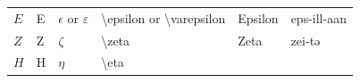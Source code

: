 \documentclass[
]{book}
\begin{document}
\begin{longtable}[]{@{}llllll@{}}
\begin{minipage}[t]{0.18\columnwidth}
\(Ε\)\strut
\end{minipage} & \begin{minipage}[t]{0.17\columnwidth}\raggedright
Ε\strut
\end{minipage} & \begin{minipage}[t]{0.18\columnwidth}\raggedright
\(\epsilon\) or \(\varepsilon\)\strut
\end{minipage} & \begin{minipage}[t]{0.17\columnwidth}\raggedright
\textbackslash epsilon or \textbackslash varepsilon\strut
\end{minipage} & \begin{minipage}[t]{0.06\columnwidth}\raggedright
Epsilon\strut
\end{minipage} & \begin{minipage}[t]{0.08\columnwidth}\raggedright
eps-ill-aan\strut
\end{minipage}\tabularnewline
\begin{minipage}[t]{0.18\columnwidth}\raggedright
\(Ζ\)\strut
\end{minipage} & \begin{minipage}[t]{0.17\columnwidth}\raggedright
Ζ\strut
\end{minipage} & \begin{minipage}[t]{0.18\columnwidth}\raggedright
\(\zeta\)\strut
\end{minipage} & \begin{minipage}[t]{0.17\columnwidth}\raggedright
\textbackslash zeta\strut
\end{minipage} & \begin{minipage}[t]{0.06\columnwidth}\raggedright
Zeta\strut
\end{minipage} & \begin{minipage}[t]{0.08\columnwidth}\raggedright
zei-tə\strut
\end{minipage}\tabularnewline
\begin{minipage}[t]{0.18\columnwidth}\raggedright
\(Η\)\strut
\end{minipage} & \begin{minipage}[t]{0.17\columnwidth}\raggedright
Η\strut
\end{minipage} & \begin{minipage}[t]{0.18\columnwidth}\raggedright
\(\eta\)\strut
\end{minipage} & \begin{minipage}[t]{0.17\columnwidth}\raggedright
\textbackslash eta\strut
\end{minipage} & \begin{minipage}[t]{0.06\columnwidth}\raggedright

\end{minipage}
\end{longtable}
\end{document}
